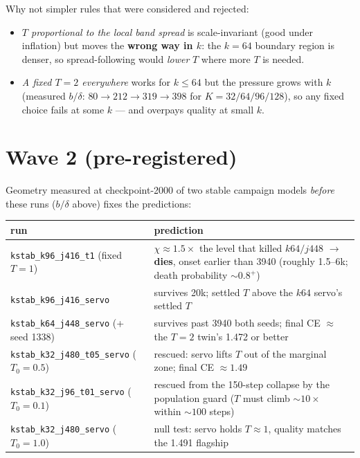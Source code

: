 \documentclass[11pt,a4paper]{article}
\newcommand{\code}[1]{\texttt{#1}}
\newcommand{\died}[1]{\textcolor{red!70!black}{\textbf{#1}}}
\begin{document}
Why not simpler rules that were considered and rejected:
\begin{itemize}[leftmargin=1.4em]
\item \emph{$T$ proportional to the local band spread} is scale-invariant
  (good under inflation) but moves the \textbf{wrong way in $k$}: the $k{=}64$
  boundary region is denser, so spread-following would \emph{lower} $T$ where
  more $T$ is needed.
\item \emph{A fixed $T{=}2$ everywhere} works for $k \le 64$ but the pressure
  grows with $k$ (measured $b/\delta$: $80 \to 212 \to 319 \to 398$ for
  $K = 32/64/96/128$), so any fixed choice fails at some $k$ --- and overpays
  quality at small $k$.
\end{itemize}

\section{Wave 2 (pre-registered)}

Geometry measured at checkpoint-2000 of two stable campaign models
\emph{before} these runs ($b/\delta$ above) fixes the predictions:

\begin{center}\small
\begin{tabular}{p{4.6cm}p{9.2cm}}
\toprule
run & prediction \\
\midrule
\code{kstab\_k96\_j416\_t1} (fixed $T{=}1$) & $\chi \approx 1.5\times$ the
level that killed $k64/j448$ $\to$ \died{dies}, onset earlier than 3940
(roughly 1.5--6k; death probability ${\sim}0.8^{+}$) \\
\code{kstab\_k96\_j416\_servo} & survives 20k; settled $T$ above the $k64$
servo's settled $T$ \\
\code{kstab\_k64\_j448\_servo} (+ seed 1338) & survives past 3940 both seeds;
final CE $\approx$ the $T{=}2$ twin's 1.472 or better \\
\code{kstab\_k32\_j480\_t05\_servo} ($T_0{=}0.5$) & rescued: servo lifts $T$
out of the marginal zone; final CE $\approx 1.49$ \\
\code{kstab\_k32\_j96\_t01\_servo} ($T_0{=}0.1$) & rescued from the 150-step
collapse by the population guard ($T$ must climb ${\sim}10\times$ within
${\sim}100$ steps) \\
\code{kstab\_k32\_j480\_servo} ($T_0{=}1.0$) & null test: servo holds
$T \approx 1$, quality matches the 1.491 flagship \\
\bottomrule
\end{tabular}
\end{center}
\end{document}
